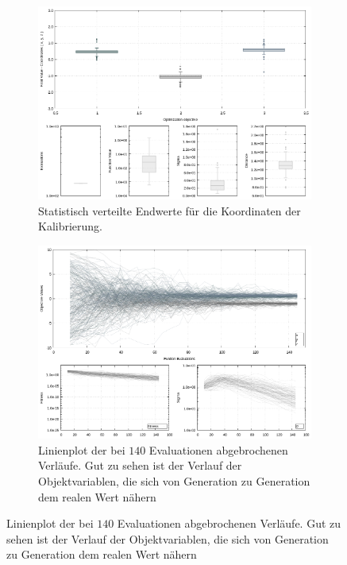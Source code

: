 %
\begin{figure}[!ht]
     \centering
     \begin{subfigure}[t]{0.45\textwidth}
             \centering
             \includegraphics[width=\textwidth]{img/calibration/aborted_calibration_ant0-boxes.png}
             \caption{Statistisch verteilte Endwerte für die Koordinaten der Kalibrierung.}
             \label{fig:abortedFinal_Calibration_Ant0_ES-boxes}
     \end{subfigure}
%
\qquad         
%
     \begin{subfigure}[t]{0.45\textwidth}
             \centering
             \includegraphics[width=\textwidth]{img/calibration/aborted_calibration_ant0-lines.png}
             \caption{Linienplot der bei $140$ Evaluationen abgebrochenen Verläufe. Gut zu sehen ist der Verlauf der Objektvariablen, die sich von Generation zu Generation dem realen Wert nähern}

\end{subfigure}
\end{figure}
